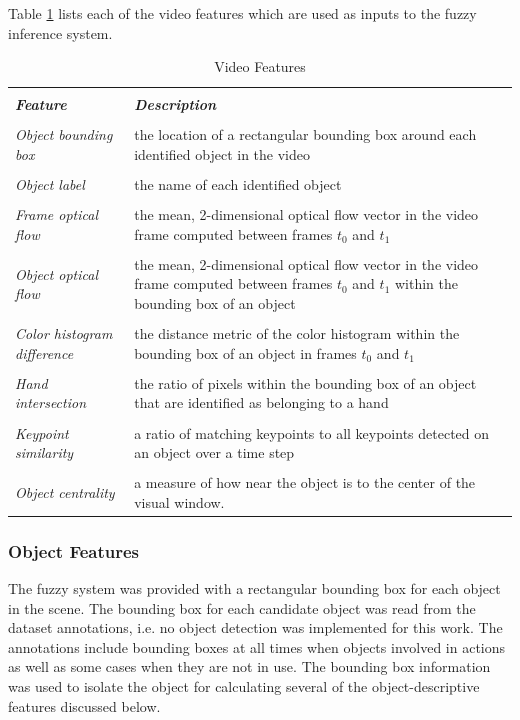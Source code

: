 \documentclass[12pt]{report}
\begin{document}
Table \ref{videoFeatures} lists each of the video features which are used as inputs to the fuzzy inference system.

\begin{table}
\caption{Video Features}
\begin{center}
\begin{tabular}{p{5cm}p{7cm}}
\hline \\
\textbf{\textit{Feature}}&\textbf{\textit{Description}} \\
\hline
\hline \\
\textit{Object bounding box} & the location of a rectangular bounding box around each identified object in the video \\ \\
\textit{Object label} & the name of each identified object \\ \\
\textit{Frame optical flow} & the mean, 2-dimensional optical flow vector in the video frame computed between frames $t_0$ and $t_1$\\ \\
\textit{Object optical flow} & the mean, 2-dimensional optical flow vector in the video frame computed between frames $t_0$ and $t_1$ within the bounding box of an object \\ \\
\textit{Color histogram difference} & the distance metric of the color histogram within the bounding box of an object in frames $t_0$ and $t_1$ \\ \\
\textit{Hand intersection} & the ratio of pixels within the bounding box of an object that are identified as belonging to a hand \\ \\
\textit{Keypoint similarity} & a ratio of matching keypoints to all keypoints detected on an object over a time step \\ \\
\textit{Object centrality} & a measure of how near the object is to the center of the visual window. \\
\hline
\end{tabular}
\label{videoFeatures}
\end{center}
\end{table}

\subsubsection{Object Features}
The fuzzy system was provided with a rectangular bounding box for each object in the scene. The bounding box for each candidate object was read from the dataset annotations, i.e. no object detection was implemented for this work. The annotations include bounding boxes at all times when objects involved in actions as well as some cases when they are not in use. The bounding box information was used to isolate the object for calculating several of the object-descriptive features discussed below.
\end{document}
